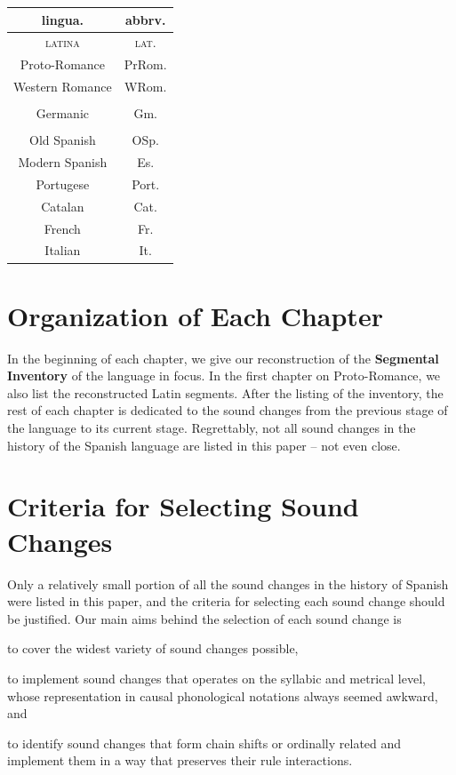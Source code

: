 \documentclass{report}[12pt]
\begin{document}
\begin{center}
  \begin{tabular}{c c}
    lingua. & abbrv. \\
    \hline
    \textsc{latina} & \textsc{lat.} \\
    Proto-Romance & PrRom. \\
    Western Romance & WRom. \\
            & \\
    Germanic & Gm. \\
            & \\
    Old Spanish & OSp. \\
    Modern Spanish & Es. \\
    Portugese & Port. \\
    Catalan & Cat. \\
    French & Fr. \\
    Italian & It. \\
  \end{tabular}
\end{center}

\section{Organization of Each Chapter}

In the beginning of each chapter, we give our reconstruction of the \textbf{Segmental Inventory} of the language in focus. In the first chapter on Proto-Romance, we also list the reconstructed Latin segments. After the listing of the inventory, the rest of each chapter is dedicated to the sound changes from the previous stage of the language to its current stage. Regrettably, not all sound changes in the history of the Spanish language are listed in this paper -- not even close.

\section{Criteria for Selecting Sound Changes}

Only a relatively small portion of all the sound changes in the history of Spanish were listed in this paper, and the criteria for selecting each sound change should be justified. Our main aims behind the selection of each sound change is
\begin{enumerate*}[label=(\alph*)]
\item to cover the widest variety of sound changes possible,
\item to implement sound changes that operates on the syllabic and metrical level, whose representation in causal phonological notations always seemed awkward, and
\item to identify sound changes that form chain shifts or ordinally related and implement them in a way that preserves their rule interactions.
\end{enumerate*}
\end{document}
